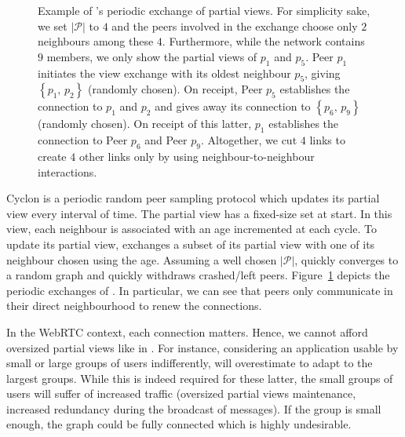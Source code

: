 \begin{figure}
  \centering
  
  \caption{\label{fig:cyclonexample}Example of \CYCLON{}'s periodic exchange of
    partial views. For simplicity sake, we set $|\mathcal{P}|$ to $4$ and the
    peers involved in the exchange choose only $2$ neighbours among these
    $4$. Furthermore, while the network contains $9$ members, we only show the
    partial views of $p_1$ and $p_5$.  Peer $p_1$ initiates the view exchange
    with its oldest neighbour $p_5$, giving $\left\{p_1,\,p_2\right\}$
    (randomly chosen). On receipt, Peer $p_5$ establishes the connection to
    $p_1$ and $p_2$ and gives away its connection to $\left\{p_6,\,p_9\right\}$
    (randomly chosen).  On receipt of this latter, $p_1$ establishes the
    connection to Peer $p_6$ and Peer $p_9$. Altogether, we cut $4$ links to
    create $4$ other links only by using neighbour-to-neighbour interactions.}
\end{figure}

\begin{asparadesc}
\item [Cyclon]\cite{voulgaris2005cyclon} is a periodic random peer sampling
  protocol which updates its partial view every interval of time. The partial
  view has a fixed-size set at start. In this view, each neighbour is
  associated with an age incremented at each cycle. To update its partial view,
  \CYCLON{} exchanges a subset of its partial view with one of its neighbour
  chosen using the age.  Assuming a well chosen $|\mathcal{P}|$, \CYCLON{}
  quickly converges to a random graph and quickly withdraws crashed/left peers.
  Figure~\ref{fig:cyclonexample} depicts the periodic exchanges of
  \CYCLON{}. In particular, we can see that peers only communicate in their
  direct neighbourhood to renew the connections.

  In the WebRTC context, each connection matters. Hence, we cannot afford
  oversized partial views like in \CYCLON{}. For instance, considering an
  application usable by small or large groups of users indifferently, \CYCLON{}
  will overestimate to adapt to the largest groups. While this is indeed
  required for these latter, the small groups of users will suffer of increased
  traffic (oversized partial views maintenance, increased redundancy during the
  broadcast of messages). If the group is small enough, the graph could be
  fully connected which is highly undesirable.
\end{asparadesc}


